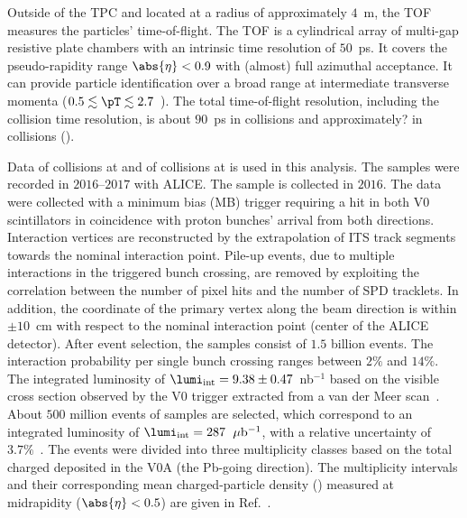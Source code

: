 Outside of the TPC and located at a radius of approximately $4$~m, the TOF measures the particles' time-of-flight.
The TOF is a cylindrical array of multi-gap resistive plate chambers with an intrinsic time resolution of $50$~ps.
It covers the pseudo-rapidity range $\abs{\eta} < 0.9$ with (almost) full azimuthal acceptance.
It can provide particle identification over a broad range at intermediate transverse momenta ($0.5 \lesssim \pT \lesssim 2.7$~\GeVc).
The total time-of-flight resolution, including the collision time resolution, is about $90$~ps in \pp collisions and approximately? in \pPb collisions ().

Data of \pp collisions at \thirteen and of \pPb collisions at \fivenn is used in this analysis.
The \pp samples were recorded in $2016$--$2017$ with ALICE.
The \pPb sample is collected in $2016$.
The data were collected with a minimum bias (MB) trigger requiring a hit in both V0 scintillators in coincidence with proton bunches' arrival from both directions.
Interaction vertices are reconstructed by the extrapolation of ITS track segments towards the nominal interaction point.
Pile-up events, due to multiple interactions in the triggered bunch crossing, are removed by exploiting the correlation between the number of pixel hits and the number of SPD tracklets.
In addition, the coordinate of the primary vertex along the beam direction is within $\pm 10$~cm with respect to the nominal interaction point (center of the ALICE detector).
After event selection, the \pp samples consist of $1.5$ billion events.
The interaction probability per single bunch crossing ranges between $2\%$ and $14\%$.
The integrated luminosity of $\lumi_{\rm int} = 9.38\pm 0.47$~nb$^{-1}$ based on the visible cross section observed by the V0 trigger extracted from a van der Meer scan~\cite{ALICE-PUBLIC-2016-002}.
About $500$ million events of \pPb samples are selected, which correspond to an integrated luminosity of $\lumi_{\rm int} = 287$~$\mu{\rm b}^{-1}$, with a relative uncertainty of $3.7\%$~\cite{collaboration_2014}.
The \pPb events were divided into three multiplicity classes based on the total charged deposited in the V0A (the Pb-going direction).
The multiplicity intervals and their corresponding mean charged-particle density (\dndeta) measured at midrapidity ($\abs{\eta} < 0.5$) are given in Ref.~\cite{Adam:2015pza}. 

